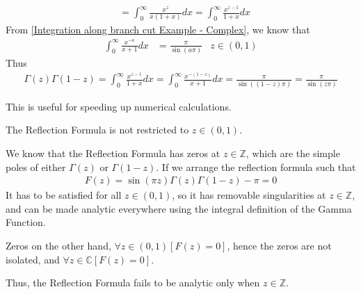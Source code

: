 \documentclass[12pt, english]{book}
\makeatletter
\renewenvironment{proof}[1][\proofname]{\par
	\pushQED{\qed}%
	\normalfont \topsep6\p@\@plus6\p@\relax
	\list{}{%
		\settowidth{\leftmargin}{\itshape\proofname:\hskip\labelsep}%
		\setlength{\labelwidth}{0pt}%
		\setlength{\itemindent}{-\leftmargin}%
		}%
	\item[\hskip\labelsep\itshape#1\@addpunct{:}]\ignorespaces
	}{\popQED\endlist\@endpefalse}
\makeatother
\begin{document}
\begin{proof}
\begin{align*}
			&= \int_{0}^{\infty} \frac{x^z}{x(1+x)} dx
			 = \int_{0}^{\infty} \frac{x^{z-1}}{1+x} dx
		\end{align*}
		From \cref{Integration along branch cut Example - Complex}, we know that 
		\begin{align*}
			\int_{0}^{\infty} \frac{x^{-a}}{x+1} dx &= \frac{\pi}{\sin(a\pi)}
				& z \in (0,1)
		\end{align*}
		Thus 
		\begin{align*}
			\Gamma(z) \Gamma(1-z) 
			= \int_{0}^{\infty} \frac{x^{z-1}}{1+x} dx
			= \int_{0}^{\infty} \frac{x^{-(1-z)}}{x+1} dx 
			= \frac{\pi}{\sin((1-z)\pi)} 
			= \frac{\pi}{\sin(z\pi)}
		\end{align*}
	\end{proof}
	
	This is useful for speeding up numerical calculations.
	
	\begin{lemma}
		The Reflection Formula is not restricted to \(z \in (0, 1)\).
	\end{lemma}
	\begin{proof}
		We know that the Reflection Formula has zeros at \(z \in \mathbb{Z}\), which are the simple poles of either \(\Gamma(z)\) or \(\Gamma(1-z)\). If we arrange the reflection formula such that 
		\begin{align*}
			F(z) = \sin(\pi z) \Gamma(z) \Gamma(1-z) - \pi = 0
		\end{align*}
		It has to be satisfied for all \(z \in (0,1)\), so it has removable singularities at \(z \in \mathbb{Z}\), and can be made analytic everywhere using the integral definition of the Gamma Function.
		
		Zeros on the other hand, \(\forall z \in (0, 1)[F(z) = 0]\), hence the zeros are not isolated, and \(\forall z \in \mathbb{C}[F(z) = 0]\).
		
		Thus, the Reflection Formula fails to be analytic only when \(z \in \mathbb{Z}\).
	\end{proof}
	
\end{document}
